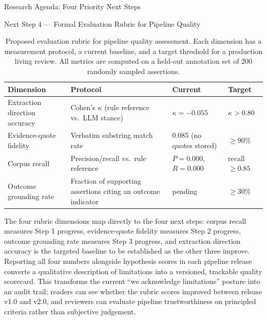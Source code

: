 \documentclass[
  ignorenonframetext,
]{beamer}
\begin{document}
\begin{frame}{Research Agenda: Four Priority
Next Steps \label{sec:next_steps}}
\begin{block}{Next Step 4 --- Formal Evaluation Rubric for Pipeline
Quality}
\begin{table}[htbp]
\centering
\caption{Proposed evaluation rubric for pipeline quality assessment. Each dimension has a measurement protocol, a current baseline, and a target threshold for a production living review. All metrics are computed on a held-out annotation set of 200 randomly sampled assertions.}
\label{tab:eval_rubric}
\begin{tabular}{llll}
\toprule
\textbf{Dimension} & \textbf{Protocol} & \textbf{Current} & \textbf{Target} \\
\midrule
Extraction direction accuracy & Cohen's $\kappa$ (rule reference vs.\ LLM stance) & $\kappa = -0.055$ & $\kappa > 0.80$ \\
Evidence-quote fidelity & Verbatim substring match rate & 0.085 (no quotes stored) & $\geq 90\%$ \\
Corpus recall & Precision/recall vs.\ rule reference & $P = 0.000$, $R = 0.000$ & recall $\geq 0.85$ \\
Outcome grounding rate & Fraction of supporting assertions citing an outcome indicator & pending & $\geq 30\%$ \\
\bottomrule
\end{tabular}
\end{table}

The four rubric dimensions map directly to the four next steps: corpus
recall measures Step 1 progress, evidence-quote fidelity measures Step 2
progress, outcome grounding rate measures Step 3 progress, and
extraction direction accuracy is the targeted baseline to be established
as the other three improve. Reporting all four numbers alongside
hypothesis scores in each pipeline release converts a qualitative
description of limitations into a versioned, trackable quality
scorecard. This transforms the current ``we acknowledge limitations''
posture into an audit trail: readers can see whether the rubric scores
improved between release v1.0 and v2.0, and reviewers can evaluate
pipeline trustworthiness on principled criteria rather than subjective
judgement.
\end{block}
\end{frame}
\end{document}
